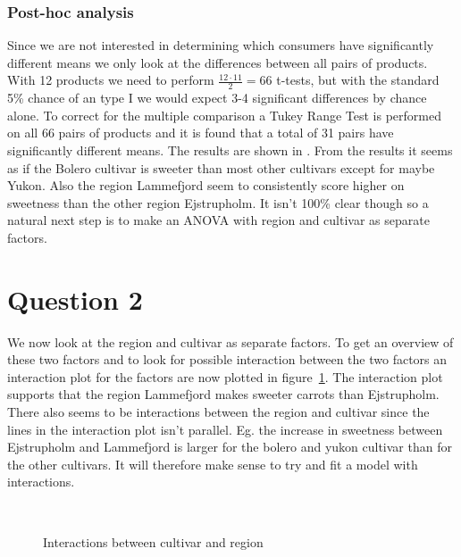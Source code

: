 \subsubsection*{Post-hoc analysis}
Since we are not interested in determining which consumers have significantly different means we only look at the differences between all pairs of products. With 12 products we need to perform $\frac{12\cdot 11}{2}=66$ t-tests, but with the standard 5\% chance of an type I we would expect 3-4 significant differences by chance alone. To correct for the multiple comparison a Tukey Range Test is performed on all 66 pairs of products and it is found that a total of 31 pairs have significantly different means. The results are shown in . From the results it seems as if the Bolero cultivar is sweeter than most other cultivars except for maybe Yukon. Also the region Lammefjord seem to consistently score higher on sweetness than the other region Ejstrupholm. It isn't 100\% clear though so a natural next step is to make an ANOVA with region and cultivar as separate factors.


\section*{Question 2}
We now look at the region and cultivar as separate factors. To get an overview of these two factors and to look for possible interaction between the two factors an interaction plot for the factors are now plotted in figure~\ref{fig:interaction-cultivar-region}. The interaction plot supports that the region Lammefjord makes sweeter carrots than Ejstrupholm. There also seems to be interactions between the region and cultivar since the lines in the interaction plot isn't parallel. Eg. the increase in sweetness between Ejstrupholm and Lammefjord is larger for the bolero and yukon cultivar than for the other cultivars. It will therefore make sense to try and fit a model with interactions. \par

\begin{figure}[ht]
    \centering
    \mbox{  }
    \caption{Interactions between cultivar and region}
    \label{fig:interaction-cultivar-region}
\end{figure}

